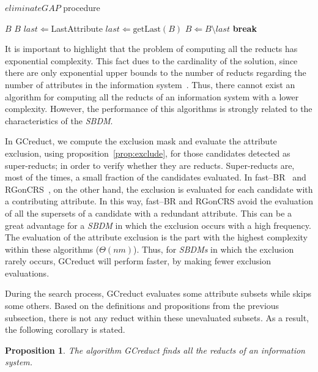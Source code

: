 \documentclass[number,preprint,review,12pt]{elsarticle}
\newtheorem{proposition}{Proposition}
\begin{document}
	\begin{algorithm}
		\footnotesize
		\caption{$eliminateGAP$ procedure}
		\label{alg:eliminateGAP}
		\begin{algorithmic}[1]	
			\Require \textit{$B$}
			\Ensure $B$ 
			\State $last \Leftarrow $LastAttribute
			\State $last \Leftarrow \mathrm{getLast}(B)$
			\State $B \Leftarrow B\setminus last$
			\State \textbf{break}\label{line:gapEnd}
			\EndIf
			\EndWhile
		\end{algorithmic}
	\end{algorithm}
		
	It is important to highlight that the problem of computing all the reducts has exponential complexity. This fact dues to the cardinality of the solution, since there are only exponential upper bounds to the number of reducts regarding the number of attributes in the information system~\cite{Skowron92}. Thus, there cannot exist an algorithm for computing all the reducts of an information system with a lower complexity. However, the performance of this algorithms is strongly related to the characteristics of the \textit{SBDM}. 
	
	\label{par:complexity}
	In GCreduct, we compute the exclusion mask and evaluate the attribute exclusion, using proposition~\ref{prop:exclude}, for those candidates detected as super-reducts; in order to verify whether they are reducts. Super-reducts are, most of the times, a small fraction of the candidates evaluated. In fast--BR~\cite{Lias13} and RGonCRS~\cite{WangP07}, on the other hand, the exclusion is evaluated for each candidate with a contributing attribute. In this way, fast--BR and RGonCRS avoid the evaluation of all the supersets of a candidate with a redundant attribute. This can be a great advantage for a \textit{SBDM} in which the exclusion occurs with a high frequency. The evaluation of the attribute exclusion is the part with the highest complexity within these algorithms ($\Theta (nm)$). Thus, for \textit{SBDMs} in which the exclusion rarely occurs, GCreduct will perform faster, by making fewer exclusion evaluations.
	
	During the search process, GCreduct evaluates some attribute subsets while skips some others. Based on the definitions and propositions from the previous subsection, there is not any reduct within these unevaluated subsets. As a result, the following corollary is stated.
	
	\begin{proposition}
		The algorithm GCreduct finds all the reducts of an information system.
	\end{proposition}
	
\end{document}
